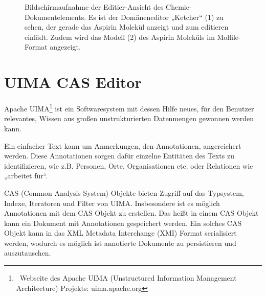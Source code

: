 \begin{figure}[h!]
\centering
\advance\leftskip-2.5cm
\caption{ Bildschirmaufnahme der Editier-Ansicht des Chemie-Dokumentelements. Es ist der Domäneneditor „Ketcher“ (1) zu sehen, der gerade das Aspirin Molekül anzeigt und zum editieren einlädt. Zudem wird das Modell (2) des Aspirin Moleküls im Molfile-Format angezeigt. }\label{chemieeditieren}
\end{figure}
 
\section{UIMA CAS Editor}\label{uima-cas-kapitel}
 
Apache UIMA\footnote{~Webseite des Apache UIMA (Unstructured Information Management Architecture) Projekts: uima.apache.org } ist ein Softwaresystem mit dessen Hilfe neues, für den Benutzer relevantes, Wissen aus großen unstrukturierten Datenmengen gewonnen werden kann.

 
Ein einfacher Text kann um Anmerkungen, den Annotationen, angereichert werden. Diese Annotationen sorgen dafür einzelne Entitäten des Texts zu identifizieren, wie z.B. Personen, Orte, Organisationen etc. oder Relationen wie „arbeitet für“.

 
CAS (Common Analysis System) Objekte bieten Zugriff auf das Typsystem, Indexe, Iteratoren und Filter von UIMA. Insbesondere ist es möglich Annotationen mit dem CAS Objekt zu erstellen. Das heißt in einem CAS Objekt kann ein Dokument mit Annotationen gespeichert werden. Ein solches CAS Objekt kann in das XML Metadata Interchange (XMI) Format serialisiert werden, wodurch es möglich ist annotierte Dokumente zu persistieren und auszutauschen.

